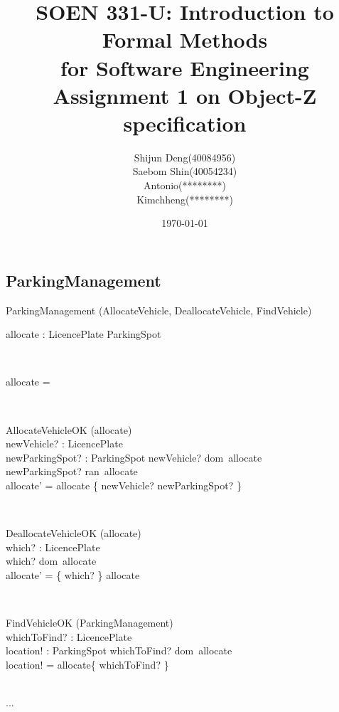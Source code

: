 \documentclass[12pt]{article}
\title{SOEN 331-U: Introduction to Formal Methods\\for Software Engineering\\
Assignment 1 on Object-Z specification}
\author{Shijun Deng(40084956)\\Saebom Shin(40054234)\\Antonio(********)\\Kimchheng(********)}
\date{\today}
\begin{document}
\begin{spacing}{1.5}

\maketitle

\newpage

\section{ParkingManagement}

\begin{class}{ParkingManagement}
\also
\upharpoonright (AllocateVehicle, DeallocateVehicle, FindVehicle) \\
\begin{state}
allocate : LicencePlate \pfun ParkingSpot\\
\where
\end{state} \\
\begin{init}
allocate = \emptyset %
\end{init} \\
\begin{op}{AllocateVehicleOK}
\Delta (allocate) \\
newVehicle? : LicencePlate\\
newParkingSpot? : ParkingSpot
\ST
newVehicle? \notin dom~allocate\\
newParkingSpot? \notin ran~allocate\\
allocate' = allocate \cup \{ newVehicle? \mapsto newParkingSpot? \}
\end{op}\\
\begin{op}{DeallocateVehicleOK}
\Delta (allocate) \\
which? : LicencePlate\\
\ST
which? \in dom~allocate\\
allocate' = \{ which? \} \ndres allocate
\end{op}\\
\begin{op}{FindVehicleOK}
\Xi (ParkingManagement)\\
whichToFind? : LicencePlate\\
location! : ParkingSpot
\ST
whichToFind? \in dom~allocate\\
location! = allocate\{ whichToFind? \}
\end{op}\\
...\\
\end{class}


\end{spacing}
\end{document}
